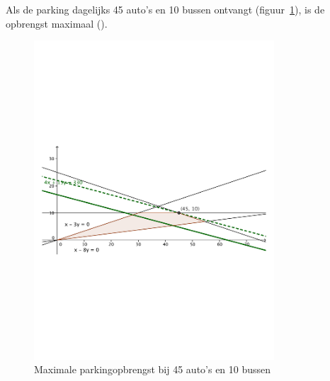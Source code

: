 \begin{Oplossing}{4.11}
Als de parking dagelijks 45 auto's en 10 bussen ontvangt (figuur~\ref{fig:autobussen}), is de opbrengst maximaal ().
                 \begin{figure}[hbtp]
\centering
\includegraphics[width=0.8\textwidth]{oefeningen/FigurenLP/Oefautosbussen.pdf}
\caption{Maximale parkingopbrengst bij 45 auto's en 10 bussen}
\label{fig:autobussen}
\end{figure}
\end{Oplossing}
